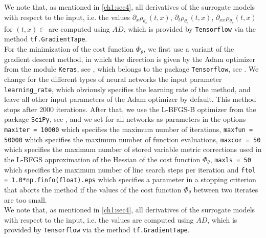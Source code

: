  

We note that, as mentioned in \cref{ch1:sec4}, all derivatives of the surrogate models with respect to the input, i.e. the values $\partial_x \rho_{\theta_e}  \left( t, x \right)$, $\partial_t \rho_{\theta_e}  \left( t, x \right)$, $\partial_{xx} \rho_{\theta_e}  \left( t, x \right)$ for $(t, x) \in $ are computed using $AD$, which is provided by \lstinline!Tensorflow! via the method \lstinline!tf.GradientTape!. \\


For the minimization of the cost function $\Phi_{\theta}$, we first use a variant of the gradient descent method, in which the direction is given by the Adam optimizer from the module \lstinline!Keras!, see \cite{Chollet:2015}, which belongs to the package \lstinline!Tensorflow!, see \cite{TensorFlow}. We change for the different types of neural networks the input parameter \lstinline!learning_rate!, which obviously specifies the learning rate of the method, and leave all other input parameters of the Adam optimizer by default. This method stops after 2000 iterations. After that, we use the L-BFGS-B optimizer from the package \lstinline!SciPy!, see \cite{SciPy:2020}, and we set for all networks as parameters in the options \lstinline!maxiter = 10000! which specifies the maximum number of iterations, \lstinline!maxfun = 50000! which specifies the maximum number of function evaluations, \lstinline!maxcor = 50! which specifies the maximum number of stored variable metric corrections used in the L-BFGS approximation of the Hessian of the cost function $\Phi_{\theta}$, \lstinline!maxls = 50! which specifies the maximum number of line search steps per iteration and \lstinline!ftol = 1.0*np.finfo(float).eps! which specifies a parameter in a stopping criterion that aborts the method if the values of the cost function $\Phi_{\theta}$ between two iterates are too small. \\
We note that, as mentioned in \cref{ch1:sec4}, all derivatives of the surrogate models with respect to the input, i.e. the values  are computed using $AD$, which is provided by \lstinline!Tensorflow! via the method \lstinline!tf.GradientTape!. \\


\begin{table}[H]\label{tab:one_cost_function}
    \caption{The values of the cost function and the L-error with respect to the values generated by the FVM method of the neural networks defined  after the learning phase. }
\end{table}

